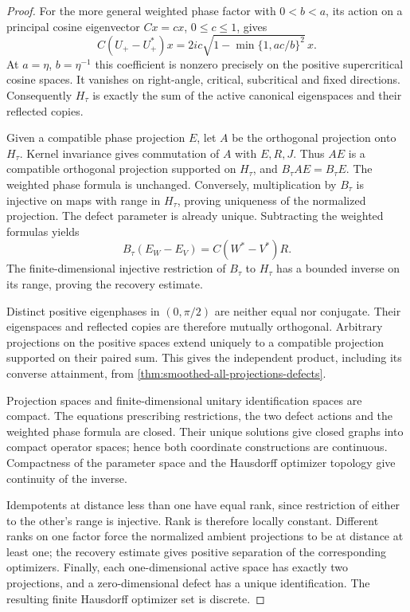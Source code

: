 \begin{proof}
For the more general weighted phase factor with $0<b<a$, its action on
a principal cosine eigenvector $Cx=cx$, $0\leq c\leq1$, gives
\[
 C(U_+-U_+^*)x=
  2ic\sqrt{1-\min\{1,ac/b\}^2}\,x.
\]
At $a=\eta$, $b=\eta^{-1}$ this coefficient is nonzero precisely on
the positive supercritical cosine spaces. It vanishes on right-angle,
critical, subcritical and fixed directions. Consequently $H_\tau$ is
exactly the sum of the active canonical eigenspaces and their reflected copies.

Given a compatible phase projection $E$, let $A$ be the orthogonal
projection onto $H_\tau$. Kernel invariance gives commutation of $A$
with $E,R,J$. Thus $AE$ is a compatible orthogonal projection supported
on $H_\tau$, and $B_\tau AE=B_\tau E$. The weighted phase formula is
unchanged. Conversely, multiplication by $B_\tau$ is injective on maps
with range in $H_\tau$, proving uniqueness of the normalized projection.
The defect parameter is already unique. Subtracting the weighted formulas yields
\[
 B_\tau(E_W-E_V)=C(W^*-V^*)R.
\]
The finite-dimensional injective restriction of $B_\tau$ to $H_\tau$
has a bounded inverse on its range, proving the recovery estimate.

Distinct positive eigenphases in $(0,\pi/2)$ are neither equal nor
conjugate. Their eigenspaces and reflected copies are therefore mutually
orthogonal. Arbitrary projections on the positive spaces extend uniquely
to a compatible projection supported on their paired sum. This gives the
independent product, including its converse attainment, from
\cref{thm:smoothed-all-projections-defects}.

Projection spaces and finite-dimensional unitary identification spaces
are compact. The equations prescribing restrictions, the two defect
actions and the weighted phase formula are closed. Their unique solutions
give closed graphs into compact operator spaces; hence both coordinate
constructions are continuous. Compactness of the parameter space and
the Hausdorff optimizer topology give continuity of the inverse.

Idempotents at distance less than one have equal rank, since restriction
of either to the other's range is injective. Rank is therefore locally
constant. Different ranks on one factor force the normalized ambient
projections to be at distance at least one; the recovery estimate gives
positive separation of the corresponding optimizers. Finally, each
one-dimensional active space has exactly two projections, and a
zero-dimensional defect has a unique identification. The resulting finite
Hausdorff optimizer set is discrete.
\end{proof}


